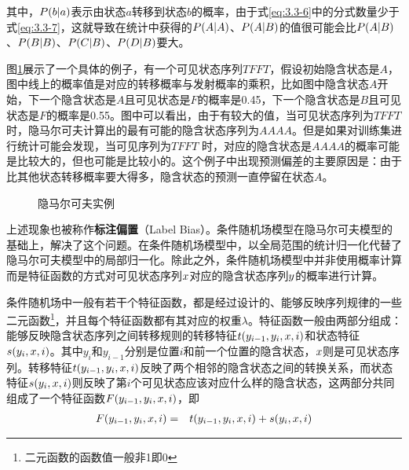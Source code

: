 \noindent 其中，${P}(b|a)$表示由状态$a$转移到状态$b$的概率，由于式\eqref{eq:3.3-6}中的分式数量少于式\eqref{eq:3.3-7}，这就导致在统计中获得的${P}(A|A)$、${P}(A|B)$的值很可能会比${P}(A|B)$、${P}(B|B)$、${P}(C|B)$、${P}(D|B)$要大。

\parinterval 图\ref{fig:3.3-5}展示了一个具体的例子，有一个可见状态序列$T F F T$，假设初始隐含状态是$A$，图中线上的概率值是对应的转移概率与发射概率的乘积，比如图中隐含状态$A$开始，下一个隐含状态是$A$且可见状态是$F$的概率是0.45，下一个隐含状态是$B$且可见状态是$F$的概率是0.55。图中可以看出，由于有较大的值，当可见状态序列为$T F F T$时，隐马尔可夫计算出的最有可能的隐含状态序列为$A A A A$。但是如果对训练集进行统计可能会发现，当可见序列为$T F F T$ 时，对应的隐含状态是$A A A A$的概率可能是比较大的，但也可能是比较小的。这个例子中出现预测偏差的主要原因是：由于比其他状态转移概率要大得多，隐含状态的预测一直停留在状态$A$。

\begin{figure}[htp]
\centering

\caption{隐马尔可夫实例}
\label{fig:3.3-5}
\end{figure}

\parinterval 上述现象也被称作{\small\sffamily\bfseries{标注偏置}}（Label Bias）。条件随机场模型在隐马尔可夫模型的基础上，解决了这个问题。在条件随机场模型中，以全局范围的统计归一化代替了隐马尔可夫模型中的局部归一化。除此之外，条件随机场模型中并非使用概率计算而是特征函数的方式对可见状态序列${x}$对应的隐含状态序列${y}$的概率进行计算。

\parinterval 条件随机场中一般有若干个特征函数，都是经过设计的、能够反映序列规律的一些二元函数\footnote{二元函数的函数值一般非1即0}，并且每个特征函数都有其对应的权重$\lambda$。特征函数一般由两部分组成：能够反映隐含状态序列之间转移规则的转移特征$t(y_{i-1},y_i,{x},i)$和状态特征$s(y_i,{x},i)$。其中$y_i$和$y_{i-1}$分别是位置$i$和前一个位置的隐含状态，${x}$则是可见状态序列。转移特征$t(y_{i-1},y_i,{x},i)$反映了两个相邻的隐含状态之间的转换关系，而状态特征$s(y_i,{x},i)$则反映了第$i$个可见状态应该对应什么样的隐含状态，这两部分共同组成了一个特征函数$F(y_{i-1},y_i,{x},i)$，即
\begin{eqnarray}
F(y_{i-1},y_i,{x},i) & = & t(y_{i-1},y_i,{x},i)+s(y_i,{x},i)
\label{eq:3.3-8}
\end{eqnarray}
	
